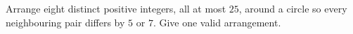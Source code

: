 Arrange eight distinct positive integers, all at most $25$, around a circle so every neighbouring pair differs by $5$ or $7$. Give one valid arrangement.
